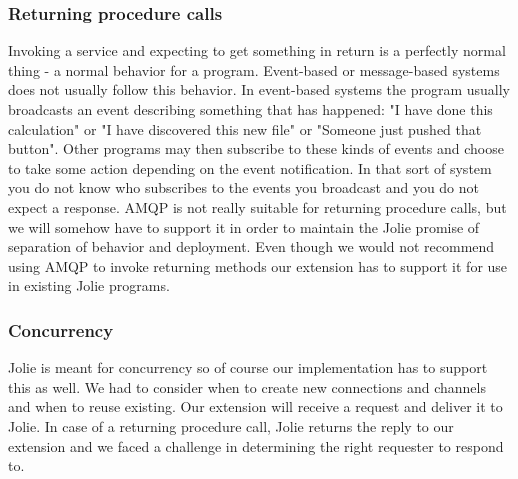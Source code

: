 \subsubsection{Returning procedure calls}
Invoking a service and expecting to get something in return is a perfectly normal thing - a normal behavior for a program. Event-based or message-based systems does not usually follow this behavior. In event-based systems the program usually broadcasts an event describing something that has happened: "I have done this calculation" or "I have discovered this new file" or "Someone just pushed that button". Other programs may then subscribe to these kinds of events and choose to take some action depending on the event notification. In that sort of system you do not know who subscribes to the events you broadcast and you do not expect a response. AMQP is not really suitable for returning procedure calls, but we will somehow have to support it in order to maintain the Jolie promise of separation of behavior and deployment. Even though we would not recommend using AMQP to invoke returning methods our extension has to support it for use in existing Jolie programs.
\subsubsection{Concurrency}
Jolie is meant for concurrency so of course our implementation has to support this as well. We had to consider when to create new connections and channels and when to reuse existing. Our extension will receive a request and deliver it to Jolie. In case of a returning procedure call, Jolie returns the reply to our extension and we faced a challenge in determining the right requester to respond to.
\newpage